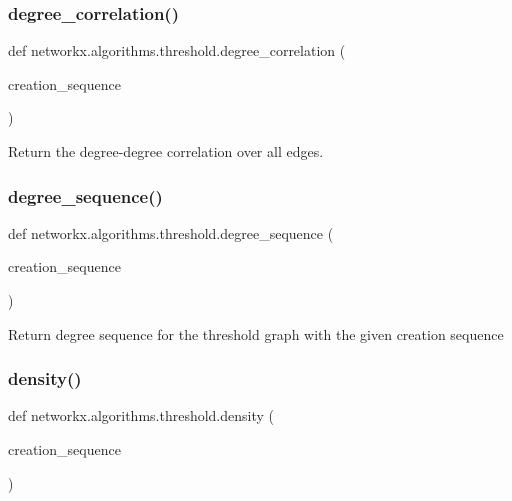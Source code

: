 \subsubsection{\texorpdfstring{degree\+\_\+correlation()}{degree\_correlation()}}
{\footnotesize\ttfamily def networkx.\+algorithms.\+threshold.\+degree\+\_\+correlation (\begin{DoxyParamCaption}\item[{}]{creation\+\_\+sequence }\end{DoxyParamCaption})}

\begin{DoxyVerb}Return the degree-degree correlation over all edges.
\end{DoxyVerb}
 \mbox{\label{namespacenetworkx_1_1algorithms_1_1threshold_a5b49bf4f8c08b7b87b61e20477ae4b00}} 
\subsubsection{\texorpdfstring{degree\+\_\+sequence()}{degree\_sequence()}}
{\footnotesize\ttfamily def networkx.\+algorithms.\+threshold.\+degree\+\_\+sequence (\begin{DoxyParamCaption}\item[{}]{creation\+\_\+sequence }\end{DoxyParamCaption})}

\begin{DoxyVerb}Return degree sequence for the threshold graph with the given
creation sequence
\end{DoxyVerb}
 \mbox{\label{namespacenetworkx_1_1algorithms_1_1threshold_af0e367378eb0fa95420bb45ffcca8226}} 
\subsubsection{\texorpdfstring{density()}{density()}}
{\footnotesize\ttfamily def networkx.\+algorithms.\+threshold.\+density (\begin{DoxyParamCaption}\item[{}]{creation\+\_\+sequence }\end{DoxyParamCaption})}

